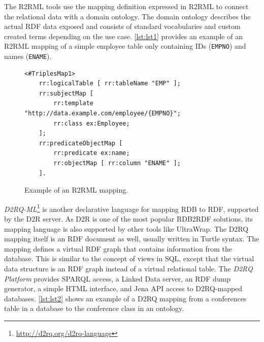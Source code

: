 The R2RML tools use the mapping definition expressed in R2RML to connect the relational data with a domain ontology.
The domain ontology describes the actual RDF data exposed and consists of standard vocabularies and custom created terms depending on the use case.
\autoref{lst:lst1} provides an example of an R2RML mapping of a simple employee table only containing IDs (\verb|EMPNO|) and names (\verb|ENAME|).


\begin{figure}[!h]
\centering
\begin{verbatim}
<#TriplesMap1>
    rr:logicalTable [ rr:tableName "EMP" ];
    rr:subjectMap [
        rr:template "http://data.example.com/employee/{EMPNO}";
        rr:class ex:Employee;
    ];
    rr:predicateObjectMap [
        rr:predicate ex:name;
        rr:objectMap [ rr:column "ENAME" ];
    ].
\end{verbatim}
\caption{Example of an R2RML mapping.}
\label{lst:lst1}
\end{figure}


\emph{D2RQ-ML}\footnote{\url{http://d2rq.org/d2rq-language}} is another declarative language for mapping RDB to RDF, supported by the D2R server.
As D2R is one of the most popular RDB2RDF solutions, its mapping language is also supported by other tools like UltraWrap.
The D2RQ mapping itself is an RDF document as well, usually written in Turtle syntax.
The mapping defines a virtual RDF graph that contains information from the database.
This is similar to the concept of views in SQL, except that the virtual data structure is an RDF graph instead of a virtual relational table.
The \emph{D2RQ Platform} provides SPARQL access, a Linked Data server, an RDF dump generator, a simple HTML interface, and Jena API access to D2RQ-mapped databases.
\autoref{lst:lst2} shows an example of a D2RQ mapping from a conferences table in a database to the conference class in an ontology.

